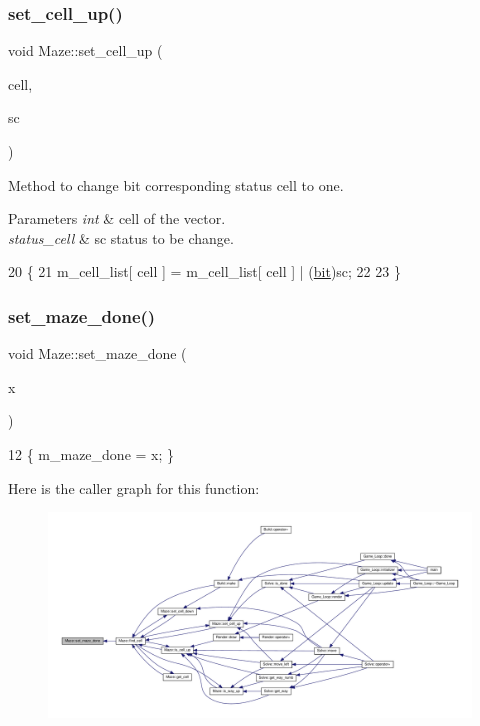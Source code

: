 \subsubsection{\texorpdfstring{set\+\_\+cell\+\_\+up()}{set\_cell\_up()}\hspace{0.1cm}{\footnotesize\ttfamily [2/2]}}
{\footnotesize\ttfamily void Maze\+::set\+\_\+cell\+\_\+up (\begin{DoxyParamCaption}\item[{int}]{cell,  }\item[{\hyperlink{classMaze_a07167e321eac2b67100fb82ecb98f1d1}{status\+\_\+cell}}]{sc }\end{DoxyParamCaption})}



Method to change bit corresponding status cell to one. 


\begin{DoxyParams}{Parameters}
{\em int} & cell of the vector. \\
\hline
{\em status\+\_\+cell} & sc status to be change. \\
\hline
\end{DoxyParams}

\begin{DoxyCode}
20 \{
21     m\_cell\_list[ cell ] = m\_cell\_list[ cell ] | (\hyperlink{maze_8h_a789d352559efaa396a258805d44f4289}{bit})sc;
22 
23 \}
\end{DoxyCode}
\mbox{\label{classMaze_ab31ce10f6d3dfdd64d15c7b48f93ed63}} 
\subsubsection{\texorpdfstring{set\+\_\+maze\+\_\+done()}{set\_maze\_done()}}
{\footnotesize\ttfamily void Maze\+::set\+\_\+maze\+\_\+done (\begin{DoxyParamCaption}\item[{int}]{x }\end{DoxyParamCaption})}


\begin{DoxyCode}
12 \{ m\_maze\_done = x; \}
\end{DoxyCode}
Here is the caller graph for this function\+:\nopagebreak
\begin{figure}[H]
\begin{center}
\leavevmode
\includegraphics[width=350pt]{classMaze_ab31ce10f6d3dfdd64d15c7b48f93ed63_icgraph}
\end{center}
\end{figure}


